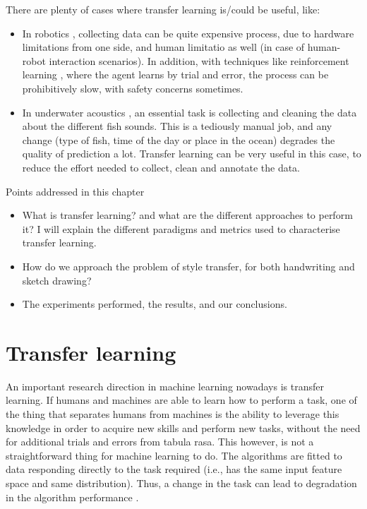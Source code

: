   \par There are plenty of cases where transfer learning is/could be useful, like:
  \begin{itemize}
    \item In robotics \citep{konidaris2012robot,Konidaris:2012:TRL:2188385.2343689}, collecting data can be quite expensive process, due to hardware limitations from one side, and human limitatio as well (in case of human-robot interaction scenarios). In addition, with techniques like reinforcement learning \citep{sutton2018reinforcement}, where the agent learns by trial and error, the process can be prohibitively slow, with safety concerns sometimes.
    \item In underwater acoustics \citep{malfante2018automatic}, an essential task is collecting and cleaning the data about the different fish sounds. This is a tediously manual job, and any change (type of fish, time of the day or place in the ocean) degrades the quality of prediction a lot. Transfer learning can be very useful in this case, to reduce the effort needed to collect, clean and annotate the data.
  \end{itemize}

  \begin{mdframed}[backgroundcolor=blue!20]
      \begin{center}
          Points addressed in this chapter
      \end{center}

      \begin{itemize}
          \item What is transfer learning? and what are the different approaches to perform it? I will explain the different paradigms and metrics used to characterise transfer learning.
          \item How do we approach the problem of style transfer, for both handwriting and sketch drawing?
          \item The experiments performed, the results, and our conclusions.
      \end{itemize}
  \end{mdframed}

\section{Transfer learning}\label{sec:transfer_learning}
  \par An important research direction in machine learning nowadays is transfer learning. If humans and machines are able to learn how to perform a task, one of the thing that separates humans from machines is the ability to leverage this knowledge in order to acquire new skills and perform new tasks, without the need for additional trials and errors from tabula rasa. This however, is not a straightforward thing for machine learning to do. The algorithms are fitted to data responding directly to the task required (i.e., has the same input feature space and same distribution). Thus, a change in the task can lead to degradation in the algorithm performance \citep{shimodaira2000improving,pan2009survey,weiss2016survey,dtl2018survey}.

